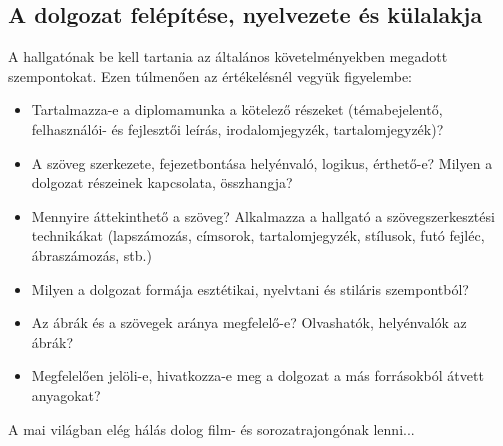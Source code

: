 \subsection{A dolgozat felépítése, nyelvezete és külalakja}
A hallgatónak be kell tartania az általános követelményekben megadott szempontokat. Ezen túlmenően az értékelésnél vegyük figyelembe:
\begin{itemize}
	\item Tartalmazza-e a diplomamunka a kötelező részeket (témabejelentő, felhasználói- és fejlesztői leírás, irodalomjegyzék, tartalomjegyzék)?
    \item A szöveg szerkezete, fejezetbontása helyénvaló, logikus, érthető-e? Milyen a dolgozat részeinek kapcsolata, összhangja?
    \item Mennyire áttekinthető a szöveg? Alkalmazza a hallgató a szövegszerkesztési technikákat (lapszámozás, címsorok, tartalomjegyzék, stílusok, futó fejléc, ábraszámozás, stb.)
    \item Milyen a dolgozat formája esztétikai, nyelvtani és stiláris szempontból?
    \item Az ábrák és a szövegek aránya megfelelő-e? Olvashatók, helyénvalók az ábrák?
    \item Megfelelően jelöli-e, hivatkozza-e meg a dolgozat a más forrásokból átvett anyagokat?
\end{itemize}

\noindent\makebox[\linewidth]{\rule{\paperwidth}{0.4pt}}

A mai világban elég hálás dolog film- és sorozatrajongónak lenni...
